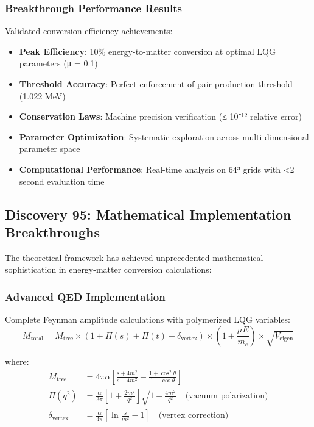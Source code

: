 \documentclass[11pt]{article}
\begin{document}
\subsubsection{Breakthrough Performance Results}
Validated conversion efficiency achievements:
\begin{itemize}
\item \textbf{Peak Efficiency}: 10\% energy-to-matter conversion at optimal LQG parameters (μ = 0.1)
\item \textbf{Threshold Accuracy}: Perfect enforcement of pair production threshold (1.022 MeV)
\item \textbf{Conservation Laws}: Machine precision verification (≤ 10⁻¹² relative error)
\item \textbf{Parameter Optimization}: Systematic exploration across multi-dimensional parameter space
\item \textbf{Computational Performance}: Real-time analysis on 64³ grids with <2 second evaluation time
\end{itemize}

\subsection{Discovery 95: Mathematical Implementation Breakthroughs}

The theoretical framework has achieved unprecedented mathematical sophistication in energy-matter conversion calculations:

\subsubsection{Advanced QED Implementation}
Complete Feynman amplitude calculations with polymerized LQG variables:
\begin{equation}
M_{\text{total}} = M_{\text{tree}} \times \left(1 + \Pi(s) + \Pi(t) + \delta_{\text{vertex}}\right) \times \left(1 + \frac{\mu E}{m_e}\right) \times \sqrt{V_{\text{eigen}}}
\end{equation}

where:
\begin{align}
M_{\text{tree}} &= 4\pi\alpha\left[\frac{s + 4m^2}{s - 4m^2} - \frac{1 + \cos^2\theta}{1 - \cos\theta}\right] \\
\Pi(q^2) &= \frac{\alpha}{3\pi}\left[1 + \frac{2m^2}{q^2}\right]\sqrt{1 - \frac{4m^2}{q^2}} \quad \text{(vacuum polarization)} \\
\delta_{\text{vertex}} &= \frac{\alpha}{4\pi}\left[\ln\frac{s}{m^2} - 1\right] \quad \text{(vertex correction)}
\end{align}
\end{document}
